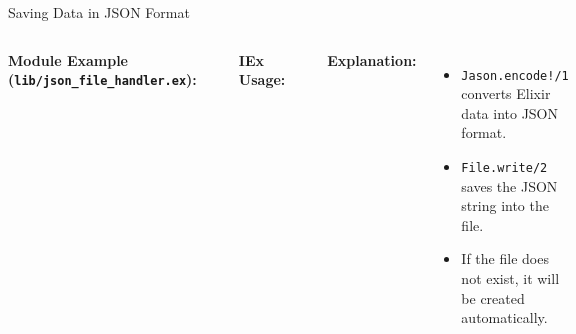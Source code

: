\documentclass[aspectratio=169, table]{beamer}
\begin{document}
\begin{frame}[fragile]{Saving Data in JSON Format}
\vspace{20pt}
\begin{columns}[t]

\textbf{Module Example (\texttt{lib/json_file_handler.ex}):}
\begin{lstlisting}[language=Elixir, basicstyle=\ttfamily\scriptsize]
defmodule JsonFileHandler do
  # Save data to a JSON file
  def save_json(filename, data) do
    File.write(filename, Jason.encode!(data))
  end
end
\end{lstlisting}

\textbf{IEx Usage:}
\begin{lstlisting}[language=Elixir, basicstyle=\ttfamily\scriptsize]
filename = "data.json"
data = %{"greeting" => "Hello, Elixir!", "count" => 42}
JsonFileHandler.save_json(filename, data)
\end{lstlisting}

\textbf{Explanation:}
\begin{itemize}
  \item \texttt{Jason.encode!/1} converts Elixir data into JSON format.
  \item \texttt{File.write/2} saves the JSON string into the file.
  \item If the file does not exist, it will be created automatically.
\end{itemize}

\end{columns}
\end{frame}
\end{document}

